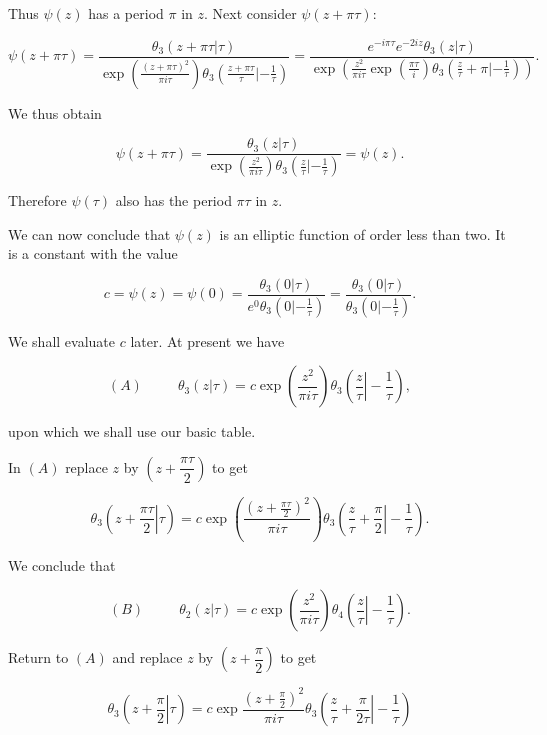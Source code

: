 \begin{solution}
Thus $\psi(z)$ has a period $\pi$ in $z$. Next consider $\psi(z+\pi \tau):$

$$\psi(z+\pi \tau) = \dfrac{\theta_3(z+\pi \tau | \tau)}{\exp \left( \frac{(z+\pi \tau)^2}{\pi i \tau} \right) \theta_3 \left( \frac{z+\pi \tau}{\tau} | - \frac{1}{\tau} \right)} = \dfrac{e^{-i \pi \tau} e^{-2iz} \theta_3(z | \tau)}{\exp \left( \frac{z^2}{\pi i \tau} \exp \left( \frac{\pi \tau}{i} \right) \theta_3 \left( \frac{z}{\tau} + \pi | - \frac{1}{\tau} \right) \right)}.$$

We thus obtain

$$\psi(z+\pi \tau) = \dfrac{\theta_3(z | \tau)}{\exp \left( \frac{z^2}{\pi i \tau} \right) \theta_3 \left( \frac{z}{\tau} | - \frac{1}{\tau} \right)} = \psi(z).$$

Therefore $\psi(\tau)$ also has the period $\pi \tau$ in $z$. 

We can now conclude that $\psi(z)$ is an elliptic function of order less than two. It is a constant with the value

$$c = \psi(z) = \psi(0) = \dfrac{\theta_3(0|\tau)}{e^0 \theta_3(0|-\frac{1}{\tau})} = \dfrac{\theta_3(0|\tau)}{\theta_3(0|-\frac{1}{\tau})}.$$

We shall evaluate $c$ later. At present we have

$$(A) \hspace{30pt} \theta_3(z|\tau) = c \exp \left( \dfrac{z^2}{\pi i \tau} \right) \theta_3 \left( \left. \dfrac{z}{\tau} \right| -\dfrac{1}{\tau} \right),$$

upon which we shall use our basic table.

In $(A)$ replace $z$ by $\left( z + \dfrac{\pi \tau}{2} \right)$ to get

$$\theta_3 \left( \left. z + \dfrac{\pi \tau}{2} \right| \tau \right) = c \exp \left( \dfrac{(z + \frac{\pi \tau}{2})^2}{\pi i \tau} \right) \theta_3 \left( \left. \dfrac{z}{\tau} + \dfrac{\pi}{2} \right| - \dfrac{1}{\tau} \right).$$

We conclude that

$$(B) \hspace{30pt} \theta_2(z|\tau) = c \exp \left( \dfrac{z^2}{\pi i \tau} \right) \theta_4 \left( \left. \dfrac{z}{\tau} \right| -\dfrac{1}{\tau} \right).$$

Return to $(A)$ and replace $z$ by $\left( z + \dfrac{\pi}{2} \right)$ to get

$$\theta_3 \left( \left. z + \dfrac{\pi}{2} \right| \tau \right) = c \exp \dfrac{(z + \frac{\pi}{2})^2}{\pi i \tau} \theta_3 \left( \left. \dfrac{z}{\tau} + \dfrac{\pi}{2 \tau} \right| - \dfrac{1}{\tau} \right)$$


\end{solution}
